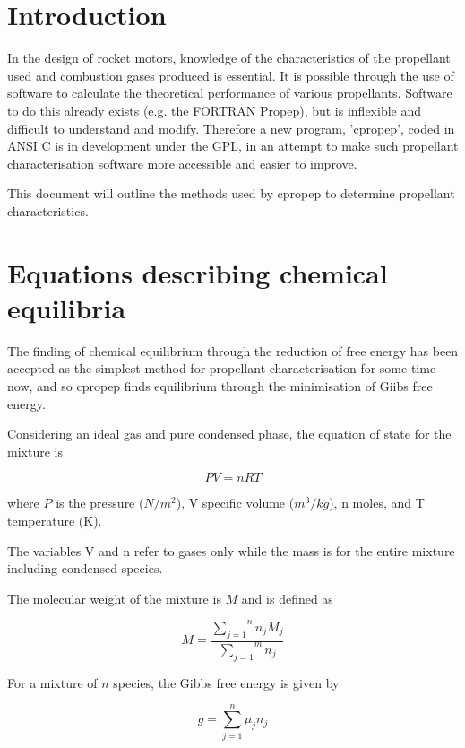 \documentclass[10pt]{article}
\begin{document}
\section*{Introduction}

In the design of rocket motors, knowledge of the characteristics of the propellant used and combustion gases produced is essential.  It is possible through the use of software to calculate the theoretical performance of various propellants.  Software to do this already exists (e.g. the FORTRAN Propep), but is inflexible and difficult to understand and modify.  Therefore a new program, 'cpropep', coded in ANSI C is in development under the GPL, in an attempt to make such propellant characterisation software more accessible and easier to improve.

This document will outline the methods used by cpropep to determine propellant characteristics.
    
\section{Equations describing chemical equilibria}

The finding of chemical equilibrium through the reduction of free energy has been accepted as the simplest method for propellant characterisation for some time now, and so cpropep finds equilibrium through the minimisation of Giibs free energy.

Considering an ideal gas and pure condensed phase, the equation of state for the mixture is

\begin{equation}PV = nRT\end{equation}

where $P$ is the pressure ($N/m^2$), V specific volume ($m^3/kg$), n
moles, and T temperature (K).

The variables V and n refer to gases only while the mass is for the
entire mixture including condensed species.

The molecular weight of the mixture is $M$ and is defined as

\begin{equation}
M = \frac{ \overset{n}{\underset{j=1}{\sum}}{n_j M_j}}{\overset{m}{\underset{j=1}{\sum}}{n_j}}
\end{equation}


For a mixture of $n$ species, the Gibbs free energy is given by

\begin{equation}
g = \sum_{j=1}^{n}{\mu_j n_j}
\end{equation}
\end{document}
